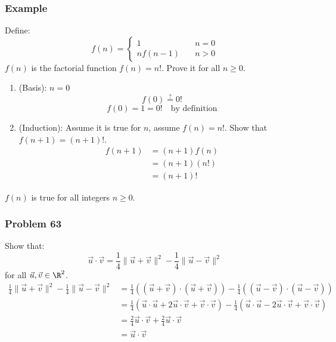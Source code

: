 \documentclass[letterpaper, 12pt]{math}
\begin{document}
\subsubsection*{Example}
Define:
\[ f(n) = \begin{cases}
  1 &\quad n = 0 \\
  nf(n-1) &\quad n > 0
\end{cases} \]
\( f(n) \) is the factorial function \( f(n) = n! \). Prove it for all \( n \ge
0 \).
\begin{enumerate}
  \item (Basis): \( n = 0 \)
    \[ f(0) \stackrel{?}{=} 0! \]
    \[ f(0) = 1 = 0! \quad \text{by definition} \]
  \item (Induction): Assume it is true for \( n \), assume \( f(n) = n! \).
    Show that \( f(n+1) = (n+1)! \).
    \begin{align*}
      f(n+1) &= (n+1)f(n) \\
      &= (n+1)(n!) \\
      &= (n+1)!
    \end{align*}
\end{enumerate}
\( f(n) \) is true for all integers \( n \ge 0 \).

\subsubsection*{Problem 63}
Show that:
\[ \vec{u}\cdot\vec{v} = \frac{1}{4}\|\vec{u}+\vec{v}\|^2-
  \frac{1}{4}\|\vec{u}-\vec{v}\|^2 \]
for all \( \vec{u},\vec{v}\in\R^2 \).
\begin{align*}
  \frac{1}{4}\|\vec{u}+\vec{v}\|^2-\frac{1}{4}\|\vec{u}-\vec{v}\|^2
  &= \frac{1}{4}((\vec{u}+\vec{v})\cdot(\vec{u}+\vec{v}))-
    \frac{1}{4}((\vec{u}-\vec{v})\cdot(\vec{u}-\vec{v})) \\
  &= \frac{1}{4}(\vec{u}\cdot\vec{u}+2\vec{u}\cdot\vec{v}+\vec{v}\cdot\vec{v})-
    \frac{1}{4}(\vec{u}\cdot\vec{u}-2\vec{u}\cdot\vec{v}+\vec{v}\cdot\vec{v}) \\
  &= \frac{2}{4}\vec{u}\cdot\vec{v}+\frac{2}{4}\vec{u}\cdot\vec{v} \\
  &= \vec{u}\cdot\vec{v}
\end{align*}
\end{document}
